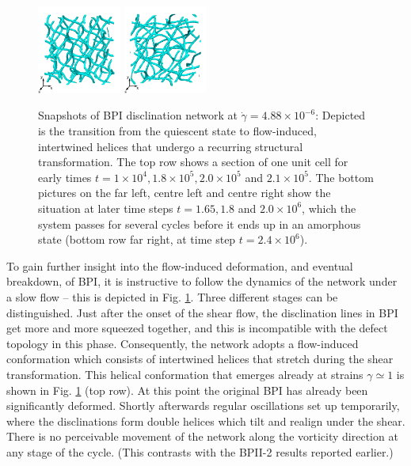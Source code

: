 \documentclass[8.5pt,twoside,twocolumn]{article}
\newcommand{\e}[1]{\times10^{#1}}
\begin{document}
\begin{figure}[htpb]
\includegraphics[width=0.245\textwidth]{disc-xy-2000k_run1115r.png}
\includegraphics[width=0.245\textwidth]{disc-xy-2400k_run1115r.png}
\caption{Snapshots of BPI disclination network at $\dot{\gamma}=4.88\e{-6}$: 
Depicted is the transition from the quiescent state to flow-induced, intertwined 
helices that undergo a recurring structural transformation. The top row
shows a section of one unit cell for early times 
$t=1\e{4}, 1.8\e{5}, 2.0\e{5}$ and $2.1\e{5}$. The bottom 
pictures on the far left, centre left and centre right 
show the situation at later time steps $t=1.65, 1.8$ and $2.0\e{6}$,
which the system passes for several cycles before it ends up in
an amorphous state (bottom row far right, at time step $t=2.4\e{6}$).}
\label{bp1-1-disc}
\end{figure}

To gain further insight into the flow-induced deformation, and eventual
breakdown, of BPI, it is instructive to follow the dynamics of 
the network under a slow flow -- this is depicted in Fig. \ref{bp1-1-disc}.
Three different stages can be distinguished. 
Just after the onset of the shear flow, the disclination lines 
in BPI get more and more squeezed together, and this is incompatible with
the defect topology in this phase.
Consequently, the network adopts a flow-induced conformation which consists 
of intertwined helices that stretch during the shear transformation.
This helical conformation that emerges already at strains $\gamma\simeq1$ 
is shown in Fig. \ref{bp1-1-disc} (top row).
At this point the original BPI has already been significantly deformed.
Shortly afterwards regular oscillations set up temporarily,
where the disclinations form double helices which tilt and realign under the shear.
There is no perceivable movement of the 
network along the vorticity direction at any stage of the cycle.
(This contrasts with the BPII-2 results reported earlier.)
\end{document}
